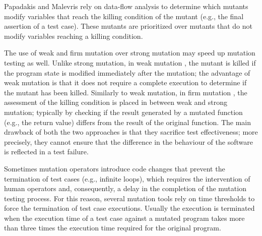 Papadakis and Malevris \cite{papadakis2011automatically} rely on data-flow analysis to determine which mutants modify variables that reach the killing condition of the mutant (e.g., the final assertion of a test case). These mutants are prioritized over mutants that do not modify variables reaching a killing condition.


The use of weak and firm mutation over strong mutation may speed up mutation testing as well.
Unlike strong mutation, 
in weak mutation \cite{ammann2016introduction}, the mutant is killed if the program state is modified immediately after the mutation; the advantage of weak mutation is that it does not require a complete execution to determine if the mutant has been killed. Similarly to weak mutation, in firm mutation \cite{ammann2016introduction}, the assessment of the killing condition is placed in between weak and strong mutation; typically by checking if the result generated by a mutated function (e.g., the return value) differs from the result of the original function. The main drawback of both the two approaches is that they sacrifice test effectiveness; more precisely, they cannot ensure that the difference in the behaviour of the software is reflected in a test failure.


Sometimes mutation operators introduce code changes that prevent the termination of test cases (e.g., infinite loops), which requires the intervention of human operators and, consequently, a delay in the completion of the mutation testing process.
For this reason, several mutation tools rely on time thresholds to force the termination of test case executions. 
Usually the execution is terminated when the execution time of a test case against a mutated program takes more than three times the execution time required for the original program.

